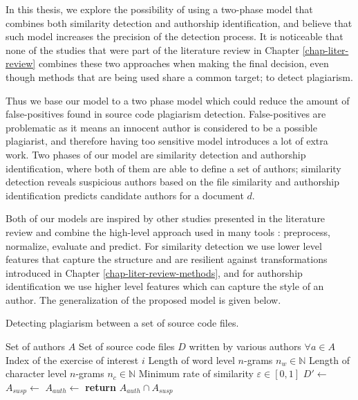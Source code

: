 
In this thesis, we explore the possibility of using a two-phase model that combines both similarity detection and authorship identification, and believe that such model increases the precision of the detection process. It is noticeable that none of the studies that were part of the literature review in Chapter \ref{chap-liter-review} combines these two approaches when making the final decision, even though methods that are being used share a common target; to detect plagiarism. 

Thus we base our model to a two phase model which could reduce the amount of false-positives found in source code plagiarism detection. False-positives are problematic as it means an innocent author is considered to be a possible plagiarist, and therefore having too sensitive model introduces a lot of extra work. Two phases of our model are similarity detection and authorship identification, where both of them are able to define a set of authors; similarity detection reveals suspicious authors based on the file similarity and authorship identification predicts candidate authors for a document $d$. 


Both of our models are inspired by other studies presented in the literature review and combine the high-level approach used in many tools \cite{RSCAD2016}: preprocess, normalize, evaluate and predict. For similarity detection we use lower level features that capture the structure and are resilient against transformations introduced in Chapter \ref{chap-liter-review-methods}, and for authorship identification we use higher level features which can capture the style of an author. The generalization of the proposed model is given below.

\begin{algorithm}[ht]
\caption{Detecting plagiarism between a set of source code files.}
\label{alg-toplvl}
\begin{algorithmic}

\Require Set of authors $A$
\Require Set of source code files $D$ written by various authors $\forall a \in A$
\Require Index of the exercise of interest $i$
\Require Length of word level $n$-grams $n_w \in \mathbb{N}$
\Require Length of character level $n$-grams $n_c \in \mathbb{N}$
\Require Minimum rate of similarity $\varepsilon \in [0, 1]$
   \State $D'\gets$ 
   \State $A_{susp} \gets$ 
   \State $A_{auth} \gets$ 
   \State \textbf{return} $A_{auth} \cap A_{susp}$
\EndProcedure

\end{algorithmic}
\end{algorithm}

